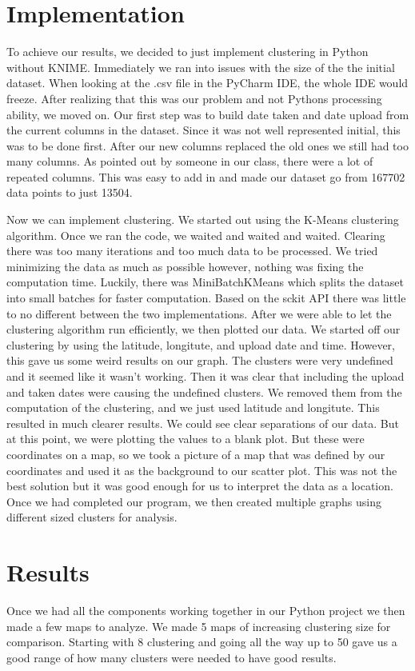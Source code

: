 \documentclass{article}
\begin{document}
\section*{Implementation}
\par
To achieve our results, we decided to just implement clustering in Python without KNIME. Immediately we ran into issues with the size of the the initial dataset.
When looking at the .csv file in the PyCharm IDE, the whole IDE would freeze. After realizing that this was our problem and not Pythons processing 
ability, we moved on. Our first step was to build date taken and date upload from the current columns in the dataset. Since it was not well 
represented initial, this was to be done first. After our new columns replaced the old ones we still had too many columns. As pointed out 
by someone in our class, there were a lot of repeated columns. This was easy to add in and made our dataset go from 167702 
data points to just 13504. 
\par 
Now we can implement clustering. We started out using the K-Means clustering algorithm. Once we ran the code, we waited and waited and waited.
Clearing there was too many iterations and too much data to be processed. We tried minimizing the data as much as possible however, nothing
was fixing the computation time. Luckily, there was MiniBatchKMeans which splits the dataset into small batches for faster computation. 
Based on the sckit API there was little to no different between the two implementations. After we were able to let the 
clustering algorithm run efficiently, we then plotted our data. We started off our clustering by using the latitude, longitute, and upload date and time. 
However, this gave us some weird results on our graph. The clusters were very undefined and it seemed like it wasn't working. Then it was
clear that including the upload and taken dates were causing the undefined clusters. We removed them from the computation of the clustering, and 
we just used latitude and longitute. This resulted in much clearer results. We could see clear separations of our data. But at this point, 
we were plotting the values to a blank plot. But these were coordinates on a map, so we took a picture of a map that was defined by our coordinates
and used it as the background to our scatter plot. This was not the best solution but it was good enough for us to interpret the data as a location. 
Once we had completed our program, we then created multiple graphs using different sized clusters for analysis. 


\section*{Results}
Once we had all the components working together in our Python project we then made a few maps to analyze. We made 5 maps of increasing clustering size for comparison. Starting with 8 clustering and going all the way up to 50 gave us a good range of how many clusters were needed to have good results. 
\end{document}

